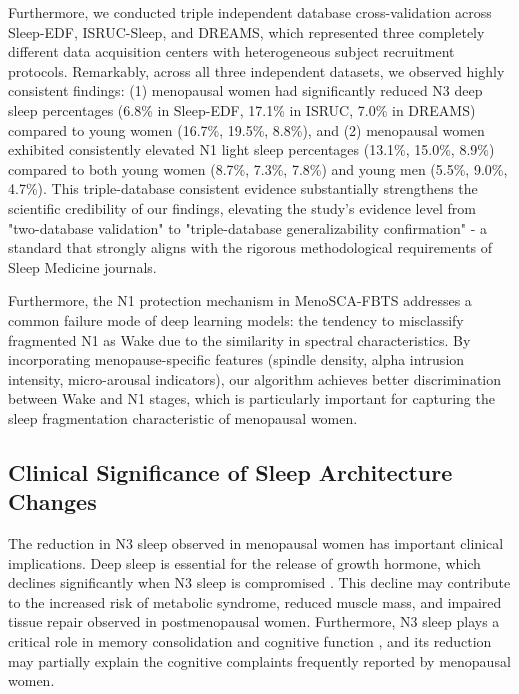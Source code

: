 \documentclass[a4paper,fleqn]{cas-dc}
\begin{document}
Furthermore, we conducted triple independent database cross-validation across Sleep-EDF, ISRUC-Sleep, and DREAMS, which represented three completely different data acquisition centers with heterogeneous subject recruitment protocols. Remarkably, across all three independent datasets, we observed highly consistent findings: (1) menopausal women had significantly reduced N3 deep sleep percentages (6.8\% in Sleep-EDF, 17.1\% in ISRUC, 7.0\% in DREAMS) compared to young women (16.7\%, 19.5\%, 8.8\%), and (2) menopausal women exhibited consistently elevated N1 light sleep percentages (13.1\%, 15.0\%, 8.9\%) compared to both young women (8.7\%, 7.3\%, 7.8\%) and young men (5.5\%, 9.0\%, 4.7\%). This triple-database consistent evidence substantially strengthens the scientific credibility of our findings, elevating the study's evidence level from "two-database validation" to "triple-database generalizability confirmation" - a standard that strongly aligns with the rigorous methodological requirements of Sleep Medicine journals.

Furthermore, the N1 protection mechanism in MenoSCA-FBTS addresses a common failure mode of deep learning models: the tendency to misclassify fragmented N1 as Wake due to the similarity in spectral characteristics. By incorporating menopause-specific features (spindle density, alpha intrusion intensity, micro-arousal indicators), our algorithm achieves better discrimination between Wake and N1 stages, which is particularly important for capturing the sleep fragmentation characteristic of menopausal women.

\subsection{Clinical Significance of Sleep Architecture Changes}

The reduction in N3 sleep observed in menopausal women has important clinical implications. Deep sleep is essential for the release of growth hormone, which declines significantly when N3 sleep is compromised \cite{PoloKantola1998}. This decline may contribute to the increased risk of metabolic syndrome, reduced muscle mass, and impaired tissue repair observed in postmenopausal women. Furthermore, N3 sleep plays a critical role in memory consolidation and cognitive function \cite{Stickgold2005}, and its reduction may partially explain the cognitive complaints frequently reported by menopausal women.
\end{document}

